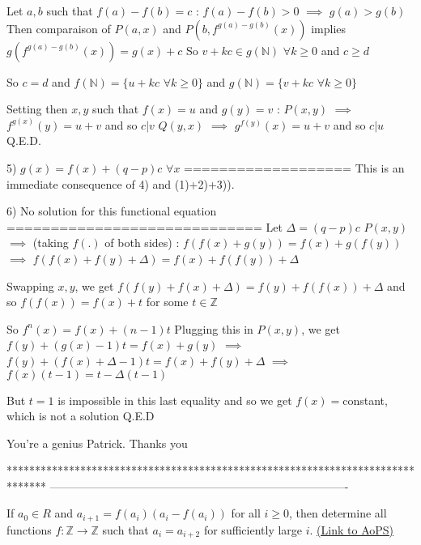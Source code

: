 \begin{solution}
Let $a,b$ such that $f(a)-f(b)=c$ : 
$f(a)-f(b)>0$ $\implies$ $g(a)>g(b)$
Then comparaison of $P(a,x)$ and $P(b,f^{g(a)-g(b)}(x))$ implies $g(f^{g(a)-g(b)}(x))=g(x)+c$
So $v+kc\in g(\mathbb N)$ $\forall k\ge 0$ and $c\ge d$

So $c=d$ and $f(\mathbb N)=\{u+kc$ $\forall k\ge 0\}$ and $g(\mathbb N)=\{v+kc$ $\forall k\ge 0\}$ 

Setting then $x,y$ such that $f(x)=u$ and $g(y)=v$ :
$P(x,y)$ $\implies$ $f^{g(x)}(y)=u+v$ and so $c|v$
$Q(y,x)$ $\implies$ $g^{f(y)}(x)=u+v$ and so $c|u$
Q.E.D.

5) $g(x)=f(x)+(q-p)c$ $\forall x$
===================
This is an immediate consequence of 4) and (1)+2)+3)).

6) No solution for this functional equation
=============================
Let $\Delta=(q-p)c$
$P(x,y)$ $\implies$ (taking $f(.)$ of both sides) : $f(f(x)+g(y))=f(x)+g(f(y))$ $\implies$ $f(f(x)+f(y)+\Delta)=f(x)+f(f(y))+\Delta$

Swapping $x,y$, we get $f(f(y)+f(x)+\Delta)=f(y)+f(f(x))+\Delta$ and so $f(f(x))=f(x)+t$ for some $t\in\mathbb Z$

So $f^n(x)=f(x)+(n-1)t$
Plugging this in $P(x,y)$, we get $f(y)+(g(x)-1)t=f(x)+g(y)$
$\implies$ $f(y)+(f(x)+\Delta-1)t=f(x)+f(y)+\Delta$
$\implies$ $f(x)(t-1)=t-\Delta(t-1)$

But $t=1$ is impossible in this last equality and so we get $f(x)=$constant, which is not a solution
Q.E.D
\end{solution}



\begin{solution}
	You're a genius Patrick. Thanks you 
\end{solution}
*******************************************************************************
-------------------------------------------------------------------------------

\begin{problem}
	If $a_0{\in}R$ and $a_{i+1}=f(a_i)(a_i-f(a_i))$ for all $i{\ge}0$, then determine all functions $f: \mathbb{Z}\to\mathbb{Z}$ such that $a_i=a_{i+2}$ for sufficiently large $i$.
	\flushright \href{https://artofproblemsolving.com/community/c6h562294}{(Link to AoPS)}
\end{problem}



